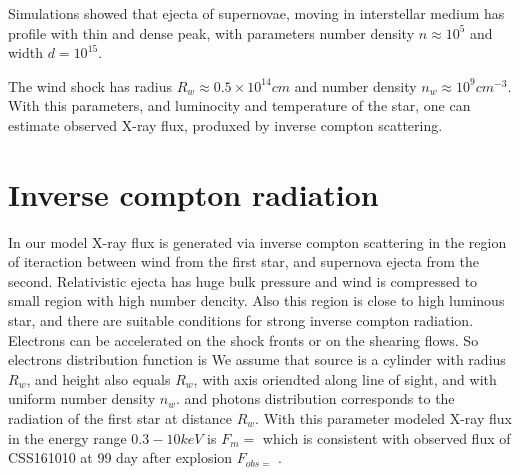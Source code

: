 \documentclass[a4paper,12pt]{extreport}
\begin{document}
Simulations showed that ejecta of supernovae, moving in interstellar medium has profile with thin and dense peak, with parameters number density $n \approx 10^5$ and width $d = 10^{15}$.

The wind shock has radius $R_w \approx 0.5\times10^{14} cm$ and number density $n_w \approx 10^9 cm^{-3}$. With this parameters, and luminocity and temperature of the star, one can estimate observed X-ray flux, produxed by inverse compton scattering.
 
\section{Inverse compton radiation}\label{compton}

In our model X-ray flux is generated via inverse compton scattering in the region of iteraction between wind from the first star, and supernova ejecta from the second. Relativistic ejecta has huge bulk pressure and wind is compressed to small region with high number dencity. Also this region is close to high luminous star, and there are suitable conditions for strong inverse compton radiation. Electrons can be accelerated on the shock fronts or on the shearing flows. So electrons distribution function is 
We assume that source is a cylinder with radius $R_w$, and height also equals $R_w$, with axis oriendted along line of sight, and with uniform number density $n_w$. 
and photons distribution corresponds to the radiation of the first star at distance $R_w$. With this parameter modeled X-ray flux in the energy range $0.3-10 keV$ is $F_m = $ which is consistent with observed flux of CSS161010 at 99 day after explosion $F_{obs = }$ \cite{Coppejans2020}.



\end{document}
